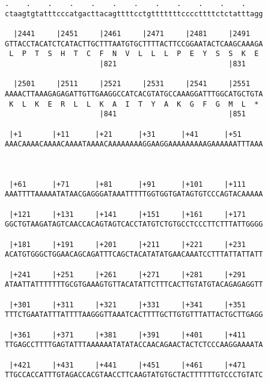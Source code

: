 \documentclass{article}
\begin{document}
\begin{Verbatim}
.    .    .    .    .    .    .    .    .    .    .    .    
ctaagtgtatttcccatgacttacagttttcctgtttttttccccttttctctatttagg
                                                            
  |2441     |2451     |2461     |2471     |2481     |2491   
GTTACCTACATCTCATACTTGCTTTAATGTGCTTTTACTTCCGGAATACTCAAGCAAAGA
 L  P  T  S  H  T  C  F  N  V  L  L  L  P  E  Y  S  S  K  E 
                      |821                          |831    
  
  |2501     |2511     |2521     |2531     |2541     |2551   
AAAACTTAAAGAGAGATTGTTGAAGGCCATCACGTATGCCAAAGGATTTGGCATGCTGTA
 K  L  K  E  R  L  L  K  A  I  T  Y  A  K  G  F  G  M  L  * 
                      |841                          |851    
  
 |+1       |+11      |+21      |+31      |+41      |+51     
AAACAAAACAAAACAAAATAAAACAAAAAAAAGGAAGGAAAAAAAAAGAAAAAATTTAAA
  
                                                            
  
 |+61      |+71      |+81      |+91      |+101     |+111    
AAATTTTAAAAATATAACGAGGGATAAATTTTTGGTGGTGATAGTGTCCCAGTACAAAAA
                                                            
 |+121     |+131     |+141     |+151     |+161     |+171    
GGCTGTAAGATAGTCAACCACAGTAGTCACCTATGTCTGTGCCTCCCTTCTTTATTGGGG
                                                            
 |+181     |+191     |+201     |+211     |+221     |+231    
ACATGTGGGCTGGAACAGCAGATTTCAGCTACATATATGAACAAATCCTTTATTATTATT
                                                            
 |+241     |+251     |+261     |+271     |+281     |+291    
ATAATTATTTTTTTGCGTGAAAGTGTTACATATTCTTTCACTTGTATGTACAGAGAGGTT
                                                            
 |+301     |+311     |+321     |+331     |+341     |+351    
TTTCTGAATATTTATTTTAAGGGTTAAATCACTTTTGCTTGTGTTTATTACTGCTTGAGG
                                                            
 |+361     |+371     |+381     |+391     |+401     |+411    
TTGAGCCTTTTGAGTATTTAAAAAATATATACCAACAGAACTACTCTCCCAAGGAAAATA
                                                            
 |+421     |+431     |+441     |+451     |+461     |+471    
TTGCCACCATTTGTAGACCACGTAACCTTCAAGTATGTGCTACTTTTTTGTCCCTGTATC
                                                            

\end{Verbatim}
\end{document}
